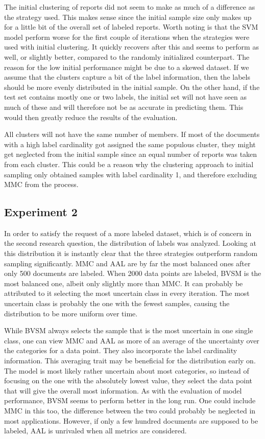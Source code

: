 The initial clustering of reports did not seem to make as much of a difference as the strategy used.
This makes sense since the initial sample size only makes up for a little bit of the overall set of labeled reports.
Worth noting is that the SVM model perform worse for the first couple of iterations when the strategies were used with initial clustering.
It quickly recovers after this and seems to perform as well, or slightly better, compared to the randomly initialized counterpart.
The reason for the low initial performance might be due to a skewed dataset.
If we assume that the clusters capture a bit of the label information, then the labels should be more evenly distributed in the initial sample.
On the other hand, if the test set contains mostly one or two labels, the initial set will not have seen as much of these and will therefore not be as accurate in predicting them.
This would then greatly reduce the results of the evaluation.

All clusters will not have the same number of members.
If most of the documents with a high label cardinality got assigned the same populous cluster, they might get neglected from the initial sample since an equal number of reports was taken from each cluster.
This could be a reason why the clustering approach to initial sampling only obtained samples with label cardinality 1, and therefore excluding MMC from the process.

\subsection{Experiment 2}

In order to satisfy the request of a more labeled dataset, which is of concern in the second research question, the distribution of labels was analyzed.
Looking at this distribution it is instantly clear that the three strategies outperform random sampling significantly.
MMC and AAL are by far the most balanced ones after only 500 documents are labeled.
When 2000 data points are labeled, BVSM is the most balanced one, albeit only slightly more than MMC.
It can probably be attributed to it selecting the most uncertain class in every iteration.
The most uncertain class is probably the one with the fewest samples, causing the distribution to be more uniform over time.

While BVSM always selects the sample that is the most uncertain in one single class, one can view MMC and AAL as more of an average of the uncertainty over the categories for a data point.
They also incorporate the label cardinality information.
This averaging trait may be beneficial for the distribution early on.
The model is most likely rather uncertain about most categories, so instead of focusing on the one with the absolutely lowest value, they select the data point that will give the overall most information.
As with the evaluation of model performance, BVSM seems to perform better in the long run.
One could include MMC in this too, the difference between the two could probably be neglected in most applications.
However, if only a few hundred documents are supposed to be labeled, AAL is unrivaled when all metrics are considered.

